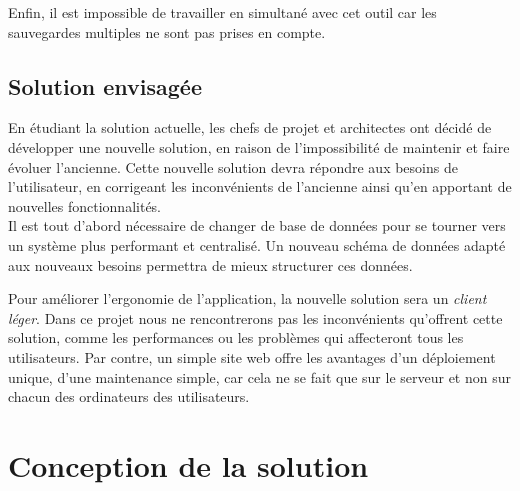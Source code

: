 Enfin, il est impossible de travailler en simultané avec cet outil car les sauvegardes multiples ne sont pas prises en compte.


\subsection{Solution envisagée}

En étudiant la solution actuelle, les chefs de projet et architectes ont décidé de développer une nouvelle solution, en raison de l'impossibilité de maintenir et faire évoluer l'ancienne.
Cette nouvelle solution devra répondre aux besoins de l'utilisateur, en corrigeant les inconvénients de l'ancienne ainsi qu'en apportant de nouvelles fonctionnalités.
\\

Il est tout d'abord nécessaire de changer de base de données pour se tourner vers un système plus performant et centralisé.
Un nouveau schéma de données adapté aux nouveaux besoins permettra de mieux structurer ces données.

Pour améliorer l'ergonomie de l'application, la nouvelle solution sera un \textit{client léger}.
Dans ce projet nous ne rencontrerons pas les inconvénients qu'offrent cette solution, comme les performances ou les problèmes qui affecteront tous les utilisateurs.
Par contre, un simple site web offre les avantages d'un déploiement unique, d'une maintenance simple, car cela ne se fait que sur le serveur et non sur chacun des ordinateurs des utilisateurs.


\section{Conception de la solution}


